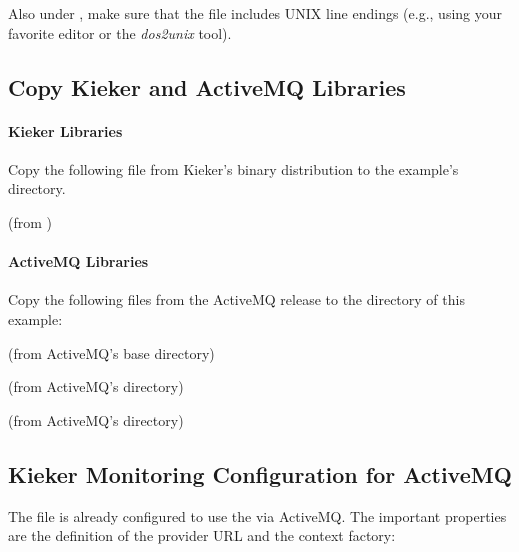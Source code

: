 \noindent Also under \UnixLikeSystems{}, make sure that the file  %
includes UNIX line endings (e.g., using your favorite editor or the \textit{dos2unix} tool).

\subsection{Copy Kieker and ActiveMQ Libraries}

\paragraph*{Kieker Libraries}

Copy the following file from Kieker's binary distribution to %
the example's  directory.

\enlargethispage{0.5cm}
\medskip

\begin{compactenum}
 \item \file{\mainJarEMF} (from )
\end{compactenum}

\paragraph*{ActiveMQ Libraries}

Copy the following files from the ActiveMQ release to the %
 directory of this example:

\medskip

\begin{compactenum}
\item {} (from ActiveMQ's base directory)
\item {} (from ActiveMQ's  directory)
\item {} (from ActiveMQ's  directory)
\end{compactenum}

\subsection{Kieker Monitoring Configuration for ActiveMQ}

The file  %
is already configured to use the  via ActiveMQ. The important properties are %
the definition of the provider URL and the context factory:

